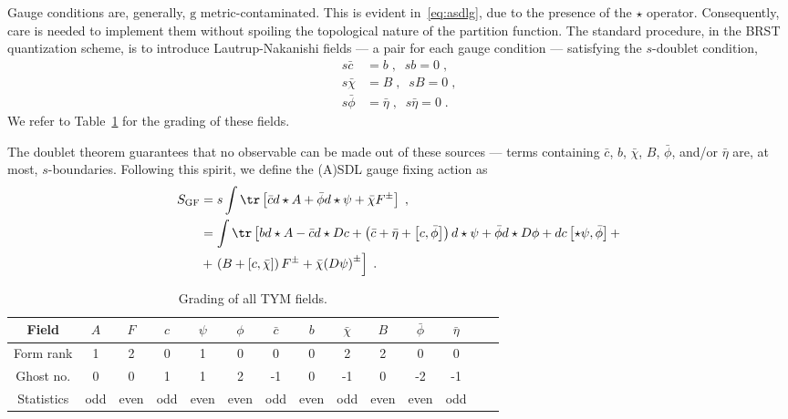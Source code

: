 \documentclass[../main/tex]{subfiles}
\begin{document}
Gauge conditions are, generally, $ \mathrm{g} $ metric-contaminated. This is evident in~\eqref{eq:asdlg}, due to the presence of the $\star$ operator. Consequently, care is needed to implement them without spoiling the topological nature of the partition function. The standard procedure, in the BRST quantization scheme, is to introduce Lautrup-Nakanishi fields --- a pair for each gauge condition --- satisfying the $s$-doublet condition,
\begin{subequations}\label{eq:anti-ghost_lautrup-nakanishi}
  \begin{align}
    s \bar{ c }  & = b \;, \;\; s b  = 0 \;,                    \\
    s \bar{\chi} & = B \;, \;\; s B        = 0 \;,              \\
    s \bar{\phi} & = \bar{\eta} \;, \;\; s \bar{ \eta } = 0 \;.
  \end{align}
\end{subequations}
We refer to Table~\ref{tab:tym-grading} for the grading of these fields.

The doublet theorem guarantees that no observable can be made out of these sources --- terms containing $\bar{c}$, $b$, $\bar{\chi}$, $B$, $\bar{\phi}$, and/or $\bar{\eta}$ are, at most, $s$-boundaries. Following this spirit, we define the (A){}SDL gauge fixing action as
\begin{subequations}\label{eq:tym-gf-action}
  \begin{align}
    S_{\text{GF}} & = s \int \tr \left[ \bar{c} d \star A + \bar{\phi} d \star \psi + \bar{\chi} F^{\pm} \right] \;,                                                                                                                                 \\
                  & =  \int \tr \left[ b d \star A - \bar{c} d \star Dc + \left( \bar{c} + \bar{\eta} + \left[ c,\bar{\phi} \right] \right) d \star \psi + \bar{\phi} d \star D \phi + d c \left[ \star \psi ,\bar{\phi} \right] + \right. \nonumber \\
                  & + \left. \left( B + \left[ c,\bar{\chi} \right] \right) F^{\pm} + \bar{\chi} {\left( D \psi \right)}^{ \pm } \right] \;.
  \end{align}
\end{subequations}

\begin{table}[htpb]
  \caption{Grading of all TYM fields.}%
  \label{tab:tym-grading}
  \begin{tabular}{cccccccccccccc}
    \toprule
    Field      & $A$ & $F$  & $c$ & $\psi$ & $\phi$ & $\bar{c}$ & $b$  & $\bar{\chi}$ & $B$  & $\bar{\phi}$ & $\bar{\eta}$ \\
    \midrule
    Form rank  & 1   & 2    & 0   & 1      & 0      & 0         & 0    & 2            & 2    & 0            & 0            \\
    Ghost no.  & 0   & 0    & 1   & 1      & 2      & -1        & 0    & -1           & 0    & -2           & -1           \\
    Statistics & odd & even & odd & even   & even   & odd       & even & odd          & even & even         & odd          \\
    \bottomrule
  \end{tabular}
\end{table}
\end{document}
